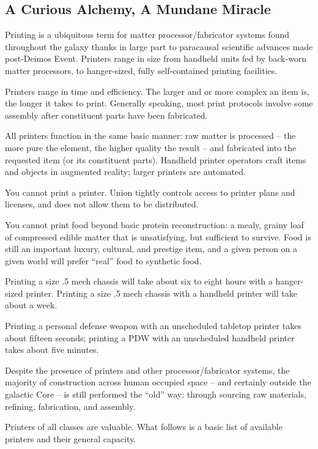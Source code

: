 \subsection{A Curious Alchemy, A Mundane Miracle}

Printing is a ubiquitous term for matter processor/fabricator systems found throughout the
galaxy thanks in large part to paracausal scientific advances made post-Deimos Event. Printers
range in size from handheld units fed by back-worn matter processors, to hanger-sized, fully
self-contained printing facilities.

Printers range in time and efficiency. The larger and or more complex an item is, the longer it
takes to print. Generally speaking, most print protocols involve some assembly after constituent
parts have been fabricated.

All printers function in the same basic manner: raw matter is processed -- the more pure the
element, the higher quality the result -- and fabricated into the requested item (or its constituent
parts). Handheld printer operators craft items and objects in augmented reality; larger printers
are automated.

You cannot print a printer. Union tightly controls access to printer plans and licenses, and does
not allow them to be distributed.

You cannot print food beyond basic protein reconstruction: a mealy, grainy loaf of compressed
edible matter that is unsatisfying, but sufficient to survive. Food is still an important luxury,
cultural, and prestige item, and a given person on a given world will prefer “real” food to
synthetic food.

Printing a size .5 mech chassis will take about six to eight hours with a hanger-sized printer.
Printing a size .5 mech chassis with a handheld printer will take about a week.

Printing a personal defense weapon with an unscheduled tabletop printer takes about fifteen
seconds; printing a PDW with an unscheduled handheld printer takes about five minutes.

Despite the presence of printers and other processor/fabricator systems, the majority of
construction across human occupied space -- and certainly outside the galactic Core -- is still
performed the “old” way: through sourcing raw materials, refining, fabrication, and assembly.

Printers of all classes are valuable. What follows is a basic list of available printers and their
general capacity.

